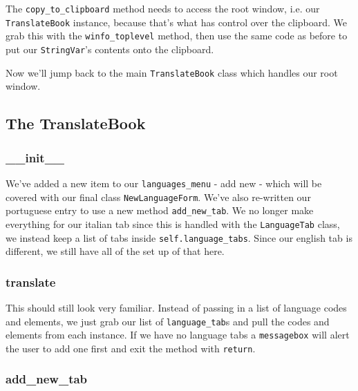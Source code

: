 \documentclass[a4paper,11pt,openany]{book}
\begin{document}
The \lstinline[columns=fixed]{copy_to_clipboard} method needs to access the root window, i.e. our \lstinline[columns=fixed]{TranslateBook} instance, because that's what has control over the clipboard. We grab this with the \lstinline[columns=fixed]{winfo_toplevel} method, then use the same code as before to put our \lstinline[columns=fixed]{StringVar}'s contents onto the clipboard.

\vspace{5mm}

Now we'll jump back to the main \lstinline[columns=fixed]{TranslateBook} class which handles our root window.

\newpage

\subsection{The TranslateBook}

 

\subsubsection{\_\_init\_\_}

We've added a new item to our \lstinline[columns=fixed]{languages_menu} - add new - which will be covered with our final class \lstinline[columns=fixed]{NewLanguageForm}. We've also re-written our portuguese entry to use a new method \lstinline[columns=fixed]{add_new_tab}. We no longer make everything for our italian tab since this is handled with the \lstinline[columns=fixed]{LanguageTab} class, we instead keep a list of tabs inside \lstinline[columns=fixed]{self.language_tabs}. Since our english tab is different, we still have all of the set up of that here.

\subsubsection{translate}

This should still look very familiar. Instead of passing in a list of language codes and elements, we just grab our list of \lstinline[columns=fixed]{language_tab}s and pull the codes and elements from each instance. If we have no language tabs a \lstinline[columns=fixed]{messagebox} will alert the user to add one first and exit the method with \lstinline[columns=fixed]{return}. 

\subsubsection{add\_new\_tab} 
\end{document}
